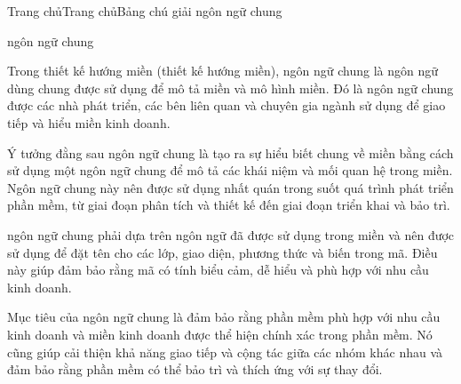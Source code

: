 







Trang chủTrang chủBảng chú giải ngôn ngữ chung

ngôn ngữ chung

Trong thiết kế hướng miền (thiết kế hướng miền), ngôn ngữ chung là ngôn ngữ dùng chung được sử dụng để mô tả miền và mô hình miền. Đó là ngôn ngữ chung được các nhà phát triển, các bên liên quan và chuyên gia ngành sử dụng để giao tiếp và hiểu miền kinh doanh.

Ý tưởng đằng sau ngôn ngữ chung là tạo ra sự hiểu biết chung về miền bằng cách sử dụng một ngôn ngữ chung để mô tả các khái niệm và mối quan hệ trong miền. Ngôn ngữ chung này nên được sử dụng nhất quán trong suốt quá trình phát triển phần mềm, từ giai đoạn phân tích và thiết kế đến giai đoạn triển khai và bảo trì.

ngôn ngữ chung phải dựa trên ngôn ngữ đã được sử dụng trong miền và nên được sử dụng để đặt tên cho các lớp, giao diện, phương thức và biến trong mã. Điều này giúp đảm bảo rằng mã có tính biểu cảm, dễ hiểu và phù hợp với nhu cầu kinh doanh.

Mục tiêu của ngôn ngữ chung là đảm bảo rằng phần mềm phù hợp với nhu cầu kinh doanh và miền kinh doanh được thể hiện chính xác trong phần mềm. Nó cũng giúp cải thiện khả năng giao tiếp và cộng tác giữa các nhóm khác nhau và đảm bảo rằng phần mềm có thể bảo trì và thích ứng với sự thay đổi.

